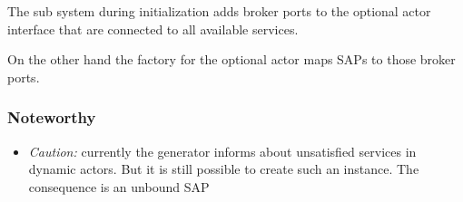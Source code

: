 The sub system during initialization adds broker ports to the optional actor interface that are connected to all available
services.

On the other hand the factory for the optional actor maps SAPs to those broker ports.

\subsubsection{Noteworthy}

\begin{itemize}
\item \emph{Caution:} currently the generator informs about unsatisfied services in dynamic actors. But it is still possible to create such an
instance. The consequence is an unbound SAP
\end{itemize}
